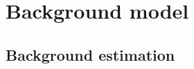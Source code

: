 \chapter{Background model}\label{chap:bkgmodel}

\section{Background estimation}\label{sec:extrap}

